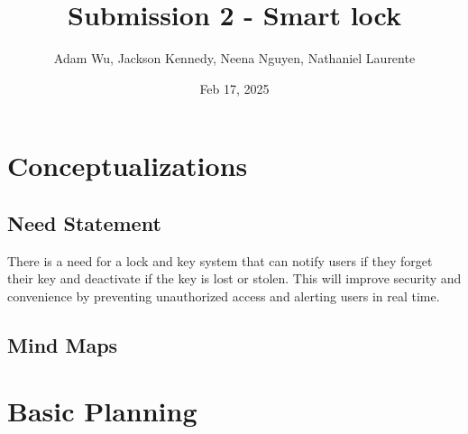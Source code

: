 \documentclass{article}
\title{Submission 2 - Smart lock} %
\author{Adam Wu, Jackson Kennedy, Neena Nguyen, Nathaniel Laurente}
\date{Feb 17, 2025}
\begin{document}
\maketitle

\tableofcontents
\newpage

\section{Conceptualizations}
\subsection{Need Statement}
There is a need for a lock and key system that can notify users if they forget their key and deactivate if the key is lost or stolen. This will improve security and convenience by preventing unauthorized access and alerting users in real time.






\subsection{Mind Maps}



\newpage
\section{Basic Planning}


\end{document}
